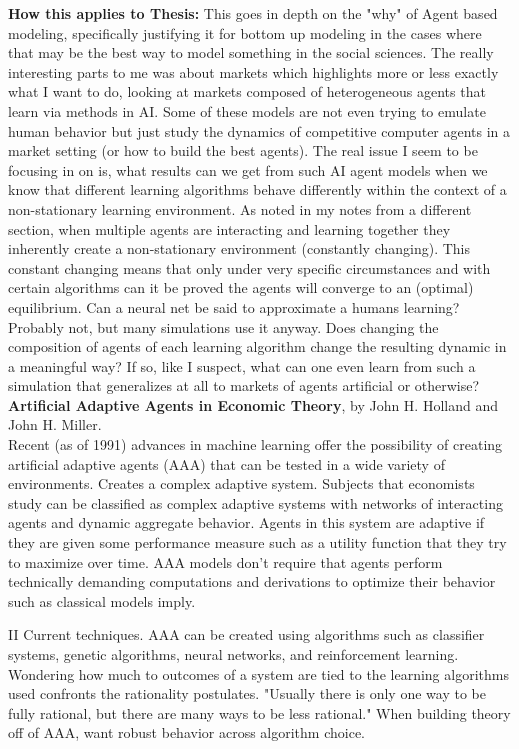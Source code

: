 \documentclass[12pt,twoside]{reedthesis}
\begin{document}
\textbf{How this applies to Thesis:} This goes in depth on the "why" of Agent based modeling, specifically justifying it for bottom up modeling in the cases where that may be the best way to model something in the social sciences. The really interesting parts to me was about markets which highlights more or less exactly what I want to do, looking at markets composed of heterogeneous agents that learn via methods in AI. Some of these models are not even trying to emulate human behavior but just study the dynamics of competitive computer agents in a market setting (or how to build the best agents). The real issue I seem to be focusing in on is, what results can we get from such AI agent models when we know that different learning algorithms behave differently within the context of a non-stationary learning environment. As noted in my notes from a different section, when multiple agents are interacting and learning together they inherently create a non-stationary environment (constantly changing). This constant changing means that only under very specific circumstances and with certain algorithms can it be proved the agents will converge to an (optimal) equilibrium. Can a neural net be said to approximate a humans learning? Probably not, but many simulations use it anyway. Does changing the composition of agents of each learning algorithm change the resulting dynamic in a meaningful way? If so, like I suspect, what can one even learn from such a simulation that generalizes at all to markets of agents artificial or otherwise?  \\  

\textbf{Artificial Adaptive Agents in Economic Theory}, by John H. Holland and John H. Miller.\\

Recent (as of 1991) advances in machine learning offer the possibility of creating artificial adaptive agents (AAA) that can be tested in a wide variety of environments. Creates a complex adaptive system. Subjects that economists study can be classified as complex adaptive systems with networks of interacting agents and dynamic aggregate behavior. Agents in this system are adaptive if they are given some performance measure such as a utility function that they try to maximize over time. AAA models don't require that agents perform technically demanding computations and derivations to optimize their behavior such as classical models imply. 

II Current techniques. AAA can be created using algorithms such as classifier systems, genetic algorithms, neural networks, and reinforcement learning. Wondering how much to outcomes of a system are tied to the learning algorithms used confronts the rationality postulates. "Usually there is only one way to be fully rational, but there are many ways to be less rational." When building theory off of AAA, want robust behavior across algorithm choice. \cite{Holland1991} \\
\end{document}
